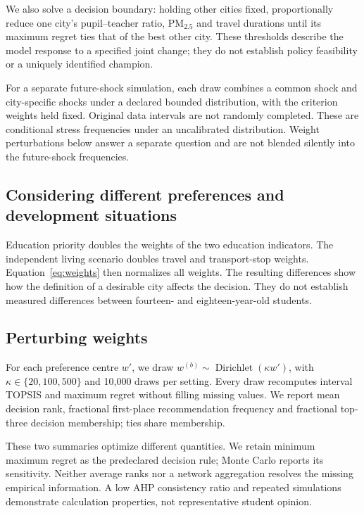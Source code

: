 \FutureDeterministic
We also solve a decision boundary: holding other cities fixed, proportionally
reduce one city's pupil--teacher ratio, PM$_{2.5}$ and travel durations until
its maximum regret ties that of the best other city. \FutureThresholds
These thresholds describe the model response to a specified joint change;
they do not establish policy feasibility or a uniquely identified champion.
\EvidenceThresholdCheck

For a separate future-shock simulation, each draw combines a common shock and
city-specific shocks under a declared bounded distribution, with the criterion
weights held fixed. Original data intervals are not randomly completed.
\FutureMonteCarlo
\ProxyWithdrawalMC
These are conditional stress frequencies under an uncalibrated distribution.
Weight perturbations below answer a separate question and are not blended
silently into the future-shock frequencies.

\subsection{Considering different preferences and development situations}
Education priority doubles the weights of the two education indicators.
The independent living scenario doubles travel and transport-stop weights.
Equation~\ref{eq:weights} then normalizes all weights.
\PreferenceResults
\PreferenceEvidenceChange
The resulting differences show how the definition of a desirable city affects
the decision. They do not establish measured differences between fourteen- and
eighteen-year-old students.

\subsection{Perturbing weights}
For each preference centre $w'$, we draw
$w^{(b)}\sim\operatorname{Dirichlet}(\kappa w')$, with
$\kappa\in\{20,100,500\}$ and 10,000 draws per setting. Every draw recomputes
interval TOPSIS and maximum regret without filling missing values. We report
mean decision rank, fractional first-place recommendation frequency and
fractional top-three decision membership; ties share membership.





\MonteCarloInterpretation
These two summaries optimize different quantities. We retain minimum maximum
regret as the predeclared decision rule; Monte Carlo reports its sensitivity.
Neither average ranks nor a network aggregation resolves the missing empirical
information. A low AHP consistency ratio and repeated simulations demonstrate
calculation properties, not representative student opinion.

